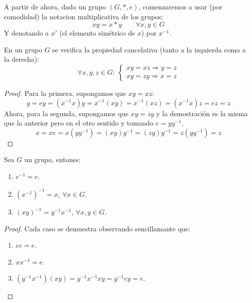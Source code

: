 \begin{notacion}
    A partir de ahora, dado un grupo $(G,\ast,e)$, comenzaremos a usar (por comodidad) la notacion multiplicativa de los grupos:
    \begin{equation*}
        xy = x\ast y \qquad \forall x,y\in G
    \end{equation*}
    Y denotando a $x'$ (el elemento simétrico de $x$) por $x^{-1}$.
\end{notacion}

\begin{prop}
    En un grupo $G$ se verifica la propiedad cancelativa (tanto a la izquierda como a la derecha):
    \begin{equation*}
        \forall x,y,z\in G:\ \left\{\begin{array}{l}
            xy = xz \Longrightarrow y = z \\
            xy = zy \Longrightarrow x = z
        \end{array}\right.
    \end{equation*}
    \begin{proof}
        Para la primera, supongamos que $xy=xz$:
        \begin{equation*}
            y = ey = (x^{-1}x)y = x^{-1}(xy) = x^{-1}(xz) = (x^{-1}x)z = ez = z
        \end{equation*}
        Ahora, para la segunda, supongamos que $xy = zy$ y la demostración es la misma que la anterior pero en el otro sentido y tomando $e = yy^{-1}$.
        \begin{equation*}
            x = xe = x(yy^{-1}) = (xy)y^{-1} = (zy)y^{-1} = z(yy^{-1}) = z
        \end{equation*}
    \end{proof}
\end{prop}

\begin{prop}
    Sea $G$ un grupo, entones:
    \begin{enumerate}
        \item $e^{-1} = e$.
        \item ${(x^{-1})}^{-1} = x$, $\forall x\in G$.
        \item ${(xy)}^{-1} = y^{-1}x^{-1}$, $\forall x,y\in G$.
    \end{enumerate}
    \begin{proof} Cada caso se demuestra observando sencillamante que:
        \begin{enumerate}
            \item $e e = e$.
            \item $xx^{-1} = e$.
            \item $(y^{-1}x^{-1})(xy) = y^{-1}x^{-1}xy = y^{-1} e y = e$.
        \end{enumerate}
    \end{proof}
\end{prop}

